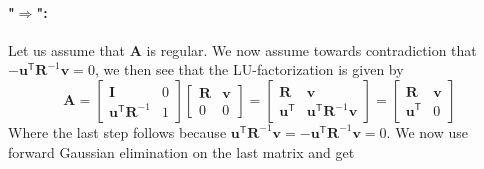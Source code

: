 \documentclass{article}
\begin{document}
\paragraph{"$\Longrightarrow$":} Let us assume that $\mathbf{A}$ is regular. We now assume towards contradiction that $- \mathbf{u}^{\mathsf{T}}\mathbf{R}^{-1}\mathbf{v} = 0$, we then see that the LU-factorization is given by
\begin{equation*}
    \mathbf{A} = \begin{bmatrix}
        \mathbf{I} & 0 \\
        \mathbf{u}^{\mathsf{T}}\mathbf{R}^{-1} & 1
    \end{bmatrix}
    \begin{bmatrix}
        \mathbf{R} & \mathbf{v} \\
        0 & 0
    \end{bmatrix} = 
    \begin{bmatrix}
        \mathbf{R} & \mathbf{v} \\
    \mathbf{u}^{\mathsf{T}} & \mathbf{u}^{\mathsf{T}}\mathbf{R}^{-1}\mathbf{v}
    \end{bmatrix} = 
    \begin{bmatrix}
        \mathbf{R} & \mathbf{v} \\
        \mathbf{u}^{\mathsf{T}} & 0
    \end{bmatrix}
\end{equation*}
Where the last step follows because $ \mathbf{u}^{\mathsf{T}}\mathbf{R}^{-1}\mathbf{v} = -\mathbf{u}^{\mathsf{T}}\mathbf{R}^{-1}\mathbf{v} = 0$. We now use forward Gaussian elimination on the last matrix and get
\end{document}
